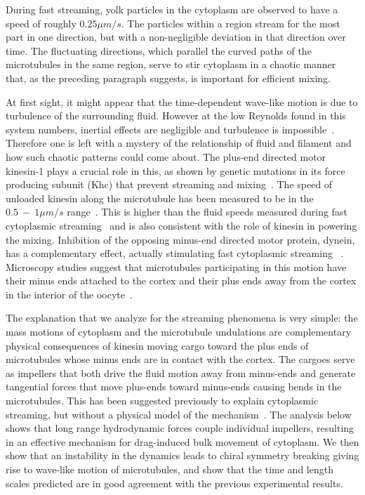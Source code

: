 \documentclass[11pt]{ucthesis}
\begin{document}
During fast streaming, yolk particles in the
cytoplasm are observed to have a speed of roughly $0.25 \mu m/s$.  The particles
within a region stream for the most part in one direction,
but with a non-negligible deviation in that direction over
time. The fluctuating directions, which parallel the curved paths of
the microtubules in the same region, serve to stir cytoplasm
in a chaotic manner that, as the preceding paragraph suggests,
is important for efficient mixing.

At first sight, it might appear that the time-dependent wave-like
motion is due to turbulence of the surrounding fluid. However at the low Reynolds found in this system
numbers, inertial effects are negligible and turbulence is
impossible~\cite{BergRandomWalksinBiology}. Therefore one is left with a mystery of
the relationship of fluid and filament and
how such chaotic patterns could come about. The plus-end
directed motor kinesin-1 plays a crucial role in this, as
shown by 
genetic mutations in its force producing subunit (Khc)  that prevent streaming and mixing~\cite{SerbusSaxton}.
The speed of unloaded kinesin along the microtubule has been
measured to be in the $0.5 ~-~ 1 \mu m/s$ range~\cite{SvobodaBlock,MeyhoferHoward}.  This is higher
than the fluid speeds measured during fast cytoplasmic streaming~\cite{SerbusSaxton}
and is also consistent with the role of kinesin in powering
the mixing.
Inhibition of the opposing minus-end directed motor protein,
dynein, has a complementary effect,
actually stimulating fast cytoplasmic streaming ~\cite{SerbusSaxton}.  Microscopy studies
suggest that microtubules participating in this motion have their
minus ends attached to the cortex and their plus ends away from
the cortex in the interior of the oocyte~\cite{SerbusSaxton,ChaSerbus}.  

The explanation
that we analyze for the streaming phenomena is very simple: the
mass motions of cytoplasm and the microtubule undulations are complementary
physical consequences of kinesin moving cargo 
toward the plus ends of microtubules whose minus ends
are in contact with the cortex. The cargoes serve as impellers that
both drive the fluid motion away from minus-ends and generate
tangential forces that move plus-ends toward minus-ends causing
bends in the microtubules. This has been suggested previously to
explain cytoplasmic streaming, but without a physical model of the
mechanism~\cite{SerbusSaxton}. The analysis below shows that long range hydrodynamic
forces couple individual impellers, resulting in an effective
mechanism for drag-induced bulk movement of cytoplasm.  We then
show that an instability in the dynamics leads to chiral symmetry breaking giving rise to
wave-like motion of microtubules, and show that the time and length scales
predicted are in good agreement with the previous experimental
results.
\end{document}
